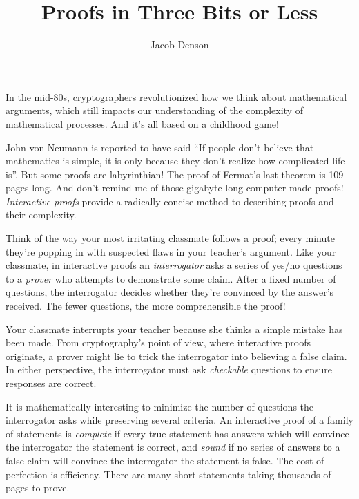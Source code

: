 \documentclass{article}
\title{Proofs in Three Bits or Less}
\author{Jacob Denson}
\theoremstyle{plain}
\theoremstyle{remark}
\theoremstyle{definition}
\begin{document}
\maketitle



{\Large In the mid-80s, cryptographers revolutionized how we think about mathematical arguments, which still impacts our understanding of the complexity of mathematical processes. And it's all based on a childhood game!}

\begin{multicols}{2}
John von Neumann is reported to have said ``If people don't believe that mathematics is simple, it is only because they don't realize how complicated life is''. But some proofs are labyrinthian! The proof of Fermat's last theorem is 109 pages long. And don’t remind me of those gigabyte-long computer-made proofs! {\it Interactive proofs} provide a radically concise method to describing proofs and their complexity.

Think of the way your most irritating classmate follows a proof; every minute they're popping in with suspected flaws in your teacher's argument. Like your classmate, in interactive proofs an {\it interrogator} asks a series of yes/no questions to a {\it prover} who attempts to demonstrate some claim. After a fixed number of questions, the interrogator decides whether they're convinced by the answer's received. The fewer questions, the more comprehensible the proof!

Your classmate interrupts your teacher because she thinks a simple mistake has been made. From cryptography's point of view, where interactive proofs originate, a prover might lie to trick the interrogator into believing a false claim. In either perspective, the interrogator must ask {\it checkable} questions to ensure responses are correct.

It is mathematically interesting to minimize the number of questions the interrogator asks while preserving several criteria. An interactive proof of a family of statements is {\it complete} if every true statement has answers which will convince the interrogator the statement is correct, and {\it sound} if no series of answers to a false claim will convince the interrogator the statement is false. The cost of perfection is efficiency. There are many short statements taking thousands of pages to prove.


\end{multicols}
\end{document}
